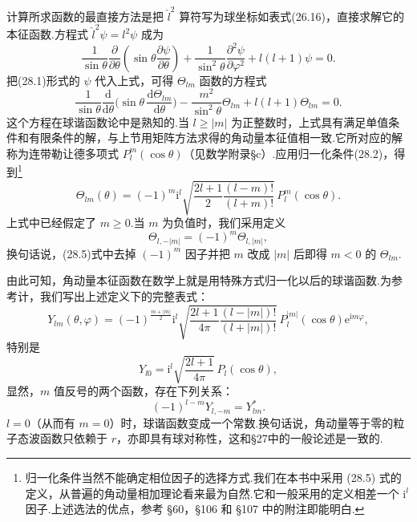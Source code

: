 计算所求函数的最直接方法是把 $\hat{l}^2$ 算符写为球坐标如表式(26.16)，直接求解它的本征函数.方程式 $\hat{l}^2\psi=l^2\psi$ 成为
\begin{equation*}
  \frac{1}{\sin\theta}\frac{\partial}{\partial\theta}
  \left(\sin\theta\frac{\partial\psi}{\partial\theta}\right)
  +\frac{1}{\sin^2\theta}\frac{\partial^2\psi}{\partial\varphi^2}
  +l(l+1)\psi=0.
\end{equation*}
把(28.1)形式的 $\psi$ 代入上式，可得 $\varTheta_{lm}$ 函数的方程式
\begin{equation}
  \frac{1}{\sin\theta}\frac{\mathrm{d}}{\mathrm{d}\theta}
  \biggl(\sin\theta\,\frac{\mathrm{d}\varTheta_{lm}}{\mathrm{d}\theta}\biggr)
  -\frac{m^2}{\sin^2\theta}\varTheta_{lm}+l(l+1)\varTheta_{lm}=0.
\end{equation}
这个方程在球谐函数论中是熟知的.当 $l\geqslant|m|$ 为正整数时，上式具有满足单值条件和有限条件的解，与上节用矩阵方法求得的角动量本征值相一致.它所对应的解称为连带勒让德多项式 $P_l^m(\cos\theta)$（见数学附录§c）.应用归一化条件(28.2)，得到\footnote{归一化条件当然不能确定相位因子的选择方式.我们在本书中采用 (28.5) 式的定义，从普遍的角动量相加理论看来最为自然.它和一般采用的定义相差一个 $\mathrm{i}^l$ 因子.上述选法的优点，参考 §60，§106 和 §107 中的附注即能明白.}
\begin{equation}
  \varTheta_{lm}(\theta)=(-1)^m\mathrm{i}^l
  \sqrt{\frac{2l+1}{2}\frac{(l-m)!}{(l+m)!}}\,P_l^m(\cos\theta).
\end{equation}
上式中已经假定了 $m\geqslant 0$.当 $m$ 为负值时，我们采用定义
\begin{equation}
  \varTheta_{l,-|m|}=(-1)^m\varTheta_{l,|m|},
\end{equation}
换句话说，(28.5)式中去掉 $(-1)^m$ 因子并把 $m$ 改成 $|m|$ 后即得 $m<0$ 的 $\varTheta_{lm}$.

由此可知，角动量本征函数在数学上就是用特殊方式归一化以后的球谐函数.为参考计，我们写出上述定义下的完整表式：
\begin{equation}
  Y_{lm}(\theta,\varphi)=(-1)^{\frac{m+|m|}{2}}\mathrm{i}^l
  \sqrt{\frac{2l+1}{4\pi}\frac{(l-|m|)!}{(l+|m|)!}}\,
  P_l^{|m|}(\cos\theta)\mathrm{e}^{\mathrm{i}m\varphi},
\end{equation}
特别是
\begin{equation}
  Y_{l0}=\mathrm{i}^l\sqrt{\frac{2l+1}{4\pi}}\,P_l(\cos\theta),
\end{equation}
显然，$m$ 值反号的两个函数，存在下列关系：
\begin{equation}
  (-1)^{l-m}Y_{l,-m}=Y_{lm}^{*}.
\end{equation}
$l=0$（从而有 $m=0$）时，球谐函数变成一个常数.换句话说，角动量等于零的粒子态波函数只依赖于 $r$，亦即具有球对称性，这和§27中的一般论述是一致的.

